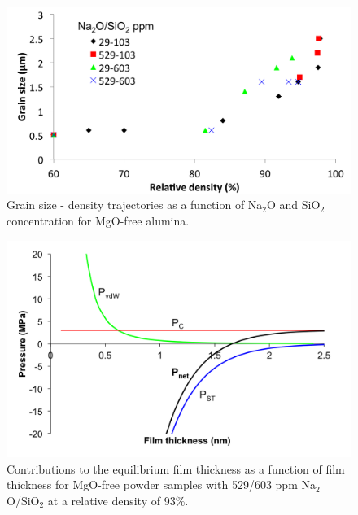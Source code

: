\newpage
\begin{figure}[H]
	\centering
	\includegraphics[width=\textwidth]{Chapter-4/Figures/Figure4.png}
	\caption{Grain size - density trajectories as a function of Na$_{2}$O and SiO$_{2}$ concentration for MgO-free alumina.}
	\label{Ch4-figure:Figure4}
\end{figure}

\newpage
\begin{figure}[H]
	\centering
	\includegraphics[width=\textwidth]{Chapter-4/Figures/Figure5.png}
	\caption{Contributions to the equilibrium film thickness as a function of film thickness for MgO-free powder samples with 529/603 ppm Na$_{2}$O/SiO$_{2}$ at a relative density of 93\%.}
	\label{Ch4-figure:Figure5}
\end{figure}

